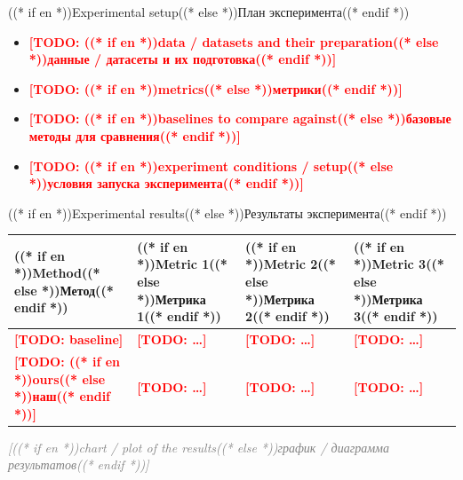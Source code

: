 \documentclass[aspectratio=169, 14pt]{beamer}
\newcommand{\todo}[1]{\textcolor{red}{\textbf{[TODO: #1]}}}
\begin{document}
\begin{frame}{((* if en *))Experimental setup((* else *))План эксперимента((* endif *))}
  \begin{itemize}
    \item \todo{((* if en *))data / datasets and their preparation((* else *))данные / датасеты и их подготовка((* endif *))}
    \item \todo{((* if en *))metrics((* else *))метрики((* endif *))}
    \item \todo{((* if en *))baselines to compare against((* else *))базовые методы для сравнения((* endif *))}
    \item \todo{((* if en *))experiment conditions / setup((* else *))условия запуска эксперимента((* endif *))}
  \end{itemize}
\end{frame}

\begin{frame}{((* if en *))Experimental results((* else *))Результаты эксперимента((* endif *))}
  \begingroup\footnotesize
  \begin{tabularx}{\textwidth}{lXXX}
    \toprule
    \textbf{((* if en *))Method((* else *))Метод((* endif *))} &
    \textbf{((* if en *))Metric 1((* else *))Метрика 1((* endif *))} &
    \textbf{((* if en *))Metric 2((* else *))Метрика 2((* endif *))} &
    \textbf{((* if en *))Metric 3((* else *))Метрика 3((* endif *))} \\
    \midrule
    \todo{baseline} & \todo{…} & \todo{…} & \todo{…} \\
    \textbf{\todo{((* if en *))ours((* else *))наш((* endif *))}} & \todo{…} & \todo{…} & \todo{…} \\
    \bottomrule
  \end{tabularx}%
  \endgroup

  \vspace{0.5em}
  \begin{center}
    \textcolor{gray}{\itshape [((* if en *))chart / plot of the results((* else *))график / диаграмма результатов((* endif *))]}
  \end{center}
\end{frame}
\end{document}
